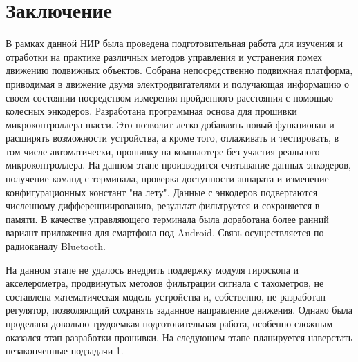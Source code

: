 \documentclass[14pt,a4paper,russian]{scrartcl}
\begin{document}
\newpage
\section*{Заключение}
В рамках данной НИР была проведена подготовительная работа для изучения и отработки
на практике различных методов управления и устранения помех движению
подвижных объектов. Собрана непосредственно подвижная платформа,
приводимая в движение двумя электродвигателями и получающая информацию
о своем состоянии посредством измерения пройденного расстояния с помощью
колесных энкодеров. Разработана программная основа для прошивки микроконтроллера
шасси. Это позволит легко добавлять новый функционал и расширять возможности
устройства, а кроме того, отлаживать и тестировать, в том числе
автоматически, прошивку на компьютере без участия реального микроконтроллера.
На данном этапе производится считывание данных энкодеров,
получение команд с терминала, проверка доступности аппарата и изменение
конфигурационных констант "на лету". Данные с энкодеров подвергаются
численному дифференциированию, результат фильтруется и сохраняется в памяти.
В качестве управляющего терминала была доработана более ранний вариант
приложения для смартфона под Android. Связь осуществляется по радиоканалу
Bluetooth.

На данном этапе не удалось внедрить поддержку модуля гироскопа и 
акселерометра, продвинутых методов фильтрации сигнала с тахометров, не
составлена математическая модель устройства и,
собственно, не разработан регулятор, позволяющий сохранять заданное направление
движения. Однако была проделана довольно трудоемкая подготовительная
работа, особенно сложным оказался этап разработки прошивки. На следующем этапе
планируется наверстать незаконченные подзадачи 1.


\newpage
\cite{Android}
\cite{Amas}
\cite{Sergienko}
\cite{Art1}
\cite{Cpp}
\cite{web:Matlab}

\renewcommand\refname{Список использованных источников}
\end{document}
